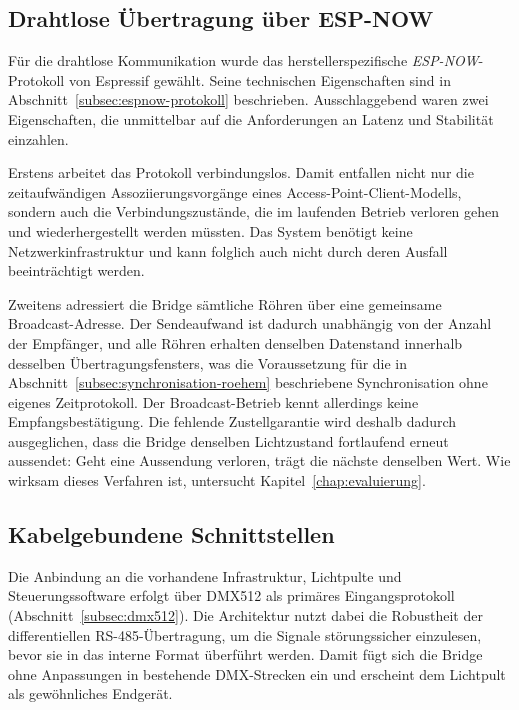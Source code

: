 \subsection{Drahtlose Übertragung über ESP-NOW}
\label{subsec:drahtlose-uebertragung}

Für die drahtlose Kommunikation wurde das herstellerspezifische
\textit{ESP-NOW}-Protokoll von Espressif gewählt. Seine technischen Eigenschaften sind in
Abschnitt~\ref{subsec:espnow-protokoll} beschrieben. Ausschlaggebend waren zwei
Eigenschaften, die unmittelbar auf die Anforderungen an Latenz und Stabilität einzahlen.

Erstens arbeitet das Protokoll verbindungslos. Damit entfallen nicht nur die
zeitaufwändigen Assoziierungsvorgänge eines Access-Point-Client-Modells, sondern auch die
Verbindungszustände, die im laufenden Betrieb verloren gehen und wiederhergestellt werden
müssten. Das System benötigt keine Netzwerkinfrastruktur und kann folglich auch nicht
durch deren Ausfall beeinträchtigt werden.

Zweitens adressiert die Bridge sämtliche Röhren über eine gemeinsame Broadcast-Adresse.
Der Sendeaufwand ist dadurch unabhängig von der Anzahl der Empfänger, und alle Röhren
erhalten denselben Datenstand innerhalb desselben Übertragungsfensters, was die
Voraussetzung für die in Abschnitt~\ref{subsec:synchronisation-roehem} beschriebene
Synchronisation ohne eigenes Zeitprotokoll. Der Broadcast-Betrieb kennt allerdings keine
Empfangsbestätigung. Die fehlende Zustellgarantie wird deshalb dadurch ausgeglichen, dass
die Bridge denselben Lichtzustand fortlaufend erneut aussendet: Geht eine Aussendung
verloren, trägt die nächste denselben Wert. Wie wirksam dieses Verfahren ist, untersucht
Kapitel~\ref{chap:evaluierung}.

\subsection{Kabelgebundene Schnittstellen}
\label{subsec:kabelgebundene-uebertragung}

Die Anbindung an die vorhandene Infrastruktur, Lichtpulte und Steuerungssoftware
erfolgt über DMX512 als primäres Eingangsprotokoll
(Abschnitt~\ref{subsec:dmx512}). Die Architektur nutzt dabei die Robustheit der
differentiellen RS-485-Übertragung, um die Signale störungssicher einzulesen, bevor sie
in das interne Format überführt werden. Damit fügt sich die Bridge ohne Anpassungen in
bestehende DMX-Strecken ein und erscheint dem Lichtpult als gewöhnliches Endgerät.

